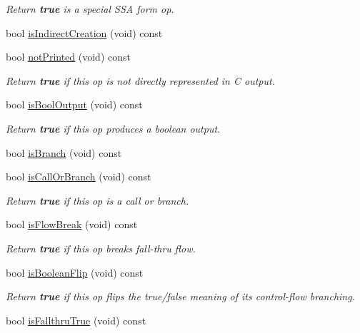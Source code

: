 \begin{DoxyCompactItemize}
\begin{DoxyCompactList}\small\item\em Return {\bfseries{true}} is a special S\+SA form op. \end{DoxyCompactList}\item 
bool \mbox{\hyperlink{class_pcode_op_afcf832c6a819d1131a4eaaa260a4e55d}{is\+Indirect\+Creation}} (void) const
\item 
bool \mbox{\hyperlink{class_pcode_op_aaef20aa623203d9c4a4dcae10ff48be0}{not\+Printed}} (void) const
\begin{DoxyCompactList}\small\item\em Return {\bfseries{true}} if this op is not directly represented in C output. \end{DoxyCompactList}\item 
bool \mbox{\hyperlink{class_pcode_op_a1e5a11d0bb8774586de3b702418535ed}{is\+Bool\+Output}} (void) const
\begin{DoxyCompactList}\small\item\em Return {\bfseries{true}} if this op produces a boolean output. \end{DoxyCompactList}\item 
bool \mbox{\hyperlink{class_pcode_op_ab1a080620a1029e3970c5745be7ec075}{is\+Branch}} (void) const
\item 
bool \mbox{\hyperlink{class_pcode_op_a1c630b06db046c161adda94895ac78d8}{is\+Call\+Or\+Branch}} (void) const
\begin{DoxyCompactList}\small\item\em Return {\bfseries{true}} if this op is a call or branch. \end{DoxyCompactList}\item 
bool \mbox{\hyperlink{class_pcode_op_aebefffa77d04696d70f483013faf0333}{is\+Flow\+Break}} (void) const
\begin{DoxyCompactList}\small\item\em Return {\bfseries{true}} if this op breaks fall-\/thru flow. \end{DoxyCompactList}\item 
bool \mbox{\hyperlink{class_pcode_op_a372abd9553271da8620c4b9597f4e2aa}{is\+Boolean\+Flip}} (void) const
\begin{DoxyCompactList}\small\item\em Return {\bfseries{true}} if this op flips the true/false meaning of its control-\/flow branching. \end{DoxyCompactList}\item 
bool \mbox{\hyperlink{class_pcode_op_af43ab623809f537adde0f3233e6a1df5}{is\+Fallthru\+True}} (void) const

\end{DoxyCompactItemize}

